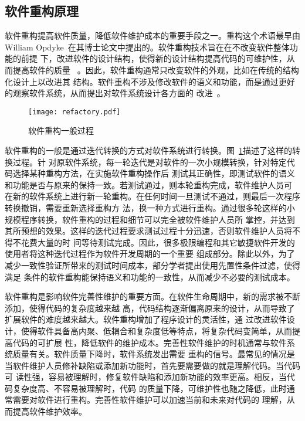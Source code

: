 \subsection{软件重构原理}
软件重构提高软件质量，降低软件维护成本的重要手段之一。重构这个术语最早由William
Opdyke~\cite{opdyke1992refactoring}在其博士论文中提出的。软件重构技术旨在在不改变软件整体功能的前提
下，改进软件的设计结构，使得新的设计结构提高代码的可维护性，从而提高软件的质量
~\cite{fowler1999refactoring}。因此，软件重构通常只改变软件的外观，比如在传统的结构化设计上以改进其
结构。软件重构不涉及修改软件的语义和功能，而是通过更好的观察软件系统，从而提出对软件系统设计各方面的
改进~\cite{chikofsky1990reverse}。

\begin{figure}
  \centering
  \texttt{[image: refactory.pdf]}  
  \caption{\label{fig:refactory}软件重构一般过程}
\end{figure}

软件重构的一般是通过迭代转换的方式对软件系统进行转换。图~\ref{fig:refactory}描述了这样的转换过程。针
对原软件系统，每一轮迭代是对软件的一次小规模转换，针对特定代码选择某种重构方法，在实施软件重构操作后
测试其正确性，即测试软件的语义和功能是否与原来的保持一致。若测试通过，则本轮重构完成，软件维护人员可
在新的软件系统上进行新一轮重构。在任何时间一旦测试不通过，则最后一次程序转换撤销，需要重新选择重构方
法，换一种方式进行重构。通过很多轮这样的小规模程序转换，软件重构的过程和细节可以完全被软件维护人员所
掌控，并达到其所预想的效果。这样的迭代过程要求测试过程十分迅速，否则软件维护人员将不得不花费大量的时
间等待测试完成。因此，很多极限编程和其它敏捷软件开发的使用者将这种迭代过程作为软件开发周期的一个重要
组成部分。除此以外，为了减少一致性验证所带来的测试时间成本，部分学者提出使用先置性条件过滤，使得满足
条件的软件重构能保持语义和功能的一致性，从而减少不必要的测试成本。

软件重构是影响软件完善性维护的重要方面。在软件生命周期中，新的需求被不断添加，使得代码的复杂度越来越
高，代码结构逐渐偏离原来的设计，从而导致了扩展软件的难度越来越大。软件重构增加了程序设计的灵活性，通
过改进软件设计，使得软件具备高内聚、低耦合和复杂度低等特点，将复杂代码变简单，从而提高代码的可扩展
性，降低软件的维护成本。完善性软件维护的时机通常与软件系统质量有关。软件质量下降时，软件系统发出需要
重构的信号。最常见的情况是当软件维护人员修补缺陷或添加新功能时，首先要需要做的就是理解代码。当代码可
读性强，容易被理解时，修复软件缺陷和添加新功能的效率更高。相反，当代码复杂度高、不容易被理解时，代码
的质量下降，可维护性也随之降低，此时通常需要对软件进行重构。完善性软件维护可以加速当前和未来对代码的
理解，从而提高软件维护效率。

